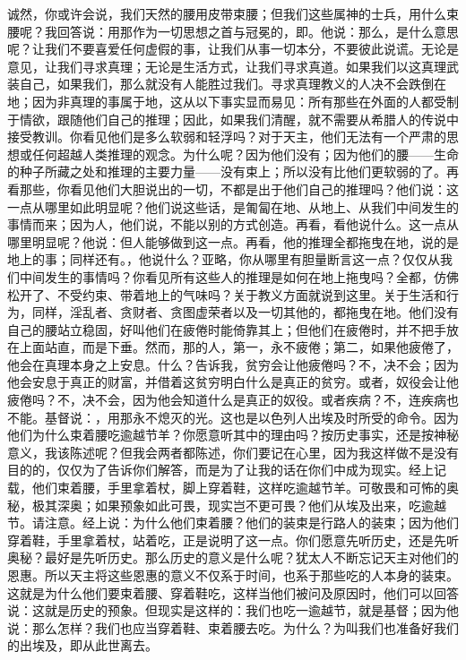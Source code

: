 诚然，你或许会说，我们天然的腰用皮带束腰；但我们这些属神的士兵，用什么束腰呢？我回答说：用那作为一切思想之首与冠冕的，即。他说：那么，是什么意思呢？让我们不要喜爱任何虚假的事，让我们从事一切本分，不要彼此说谎。无论是意见，让我们寻求真理；无论是生活方式，让我们寻求真道。如果我们以这真理武装自己，如果我们，那么就没有人能胜过我们。寻求真理教义的人决不会跌倒在地；因为非真理的事属于地，这从以下事实显而易见：所有那些在外面的人都受制于情欲，跟随他们自己的推理；因此，如果我们清醒，就不需要从希腊人的传说中接受教训。你看见他们是多么软弱和轻浮吗？对于天主，他们无法有一个严肃的思想或任何超越人类推理的观念。为什么呢？因为他们没有；因为他们的腰——生命的种子所藏之处和推理的主要力量——没有束上；所以没有比他们更软弱的了。再看那些，你看见他们大胆说出的一切，不都是出于他们自己的推理吗？他们说：这一点从哪里如此明显呢？他们说这些话，是匍匐在地、从地上、从我们中间发生的事情而来；因为人，他们说，不能以别的方式创造。再看，看他说什么。这一点从哪里明显呢？他说：但人能够做到这一点。再看，他的推理全都拖曳在地，说的是地上的事；同样还有。，他说什么？亚略，你从哪里有胆量断言这一点？仅仅从我们中间发生的事情吗？你看见所有这些人的推理是如何在地上拖曳吗？全都，仿佛松开了、不受约束、带着地上的气味吗？关于教义方面就说到这里。关于生活和行为，同样，淫乱者、贪财者、贪图虚荣者以及一切其他的，都拖曳在地。他们没有自己的腰站立稳固，好叫他们在疲倦时能倚靠其上；但他们在疲倦时，并不把手放在上面站直，而是下垂。然而，那的人，第一，永不疲倦；第二，如果他疲倦了，他会在真理本身之上安息。什么？告诉我，贫穷会让他疲倦吗？不，决不会；因为他会安息于真正的财富，并借着这贫穷明白什么是真正的贫穷。或者，奴役会让他疲倦吗？不，决不会，因为他会知道什么是真正的奴役。或者疾病？不，连疾病也不能。基督说：，用那永不熄灭的光。这也是以色列人出埃及时所受的命令。因为他们为什么束着腰吃逾越节羊？你愿意听其中的理由吗？按历史事实，还是按神秘意义，我该陈述呢？但我会两者都陈述，你们要记在心里，因为我这样做不是没有目的的，仅仅为了告诉你们解答，而是为了让我的话在你们中成为现实。经上记载，他们束着腰，手里拿着杖，脚上穿着鞋，这样吃逾越节羊。可敬畏和可怖的奥秘，极其深奥；如果预象如此可畏，现实岂不更可畏？他们从埃及出来，吃逾越节。请注意。经上说：为什么他们束着腰？他们的装束是行路人的装束；因为他们穿着鞋，手里拿着杖，站着吃，正是说明了这一点。你们愿意先听历史，还是先听奥秘？最好是先听历史。那么历史的意义是什么呢？犹太人不断忘记天主对他们的恩惠。所以天主将这些恩惠的意义不仅系于时间，也系于那些吃的人本身的装束。这就是为什么他们要束着腰、穿着鞋吃，这样当他们被问及原因时，他们可以回答说：这就是历史的预象。但现实是这样的：我们也吃一逾越节，就是基督；因为他说：那么怎样？我们也应当穿着鞋、束着腰去吃。为什么？为叫我们也准备好我们的出埃及，即从此世离去。\par

